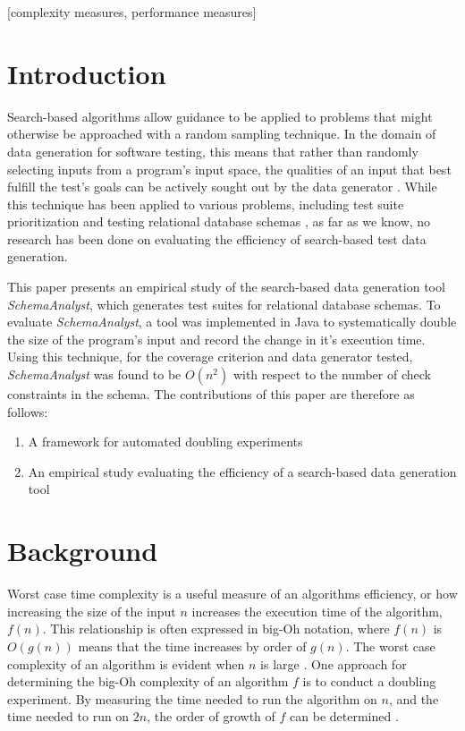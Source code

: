 \documentclass{sig-alternate}
\begin{document}
[complexity measures, performance measures]

\section{Introduction}
Search-based algorithms allow guidance to be applied to problems that
might otherwise be approached with a random sampling technique. In the
domain of data generation for software testing, this means that rather
than randomly selecting inputs from a program's input space, the
qualities of an input that best fulfill the test's goals can be
actively sought out by the data generator \cite{McMinn:Thesis}. While this
technique has been applied to various problems, including test suite
prioritization \cite{Walcott:tsp} and testing
relational database schemas \cite{Kapfhammer2013}, 
as far as we know, no research has been done on evaluating the efficiency
of search-based test data generation. 

This paper presents an empirical study of the search-based data
generation tool \textit{SchemaAnalyst}, which generates test suites for
relational database schemas.  To evaluate \textit{SchemaAnalyst}, a tool
was implemented in Java to systematically double the size of the
program's input and record the change in it's execution time. Using this
technique, for the coverage criterion and data generator tested, 
\textit{SchemaAnalyst} was found to be $O(n^2)$ with respect
to the number of check constraints in the schema. The contributions of
this paper are therefore as follows:
\begin{enumerate}
  \item A framework for automated doubling experiments
  \item An empirical study evaluating the efficiency of a search-based
    data generation tool
  \end{enumerate}

\section{Background}

Worst case time complexity is a useful measure of an algorithms
efficiency, or how increasing the size
of the input $n$ increases the execution time of the algorithm, $f(n)$.
This relationship is often expressed in big-Oh notation, where $f(n)$
is $O(g(n))$ means that the time increases by order of $g(n)$. The worst
case complexity of an algorithm is evident when $n$ is large 
\cite{Goodrich:Data}. One approach for determining the big-Oh complexity
of an algorithm $f$ is to conduct a doubling experiment. By measuring the
time needed to run the algorithm on $n$, and the time needed to run on $2n$, the order of growth
of $f$ can be determined \cite{Mcgeoch:Algorithmics,
Sedgewick:Analysis}. 
\end{document}
